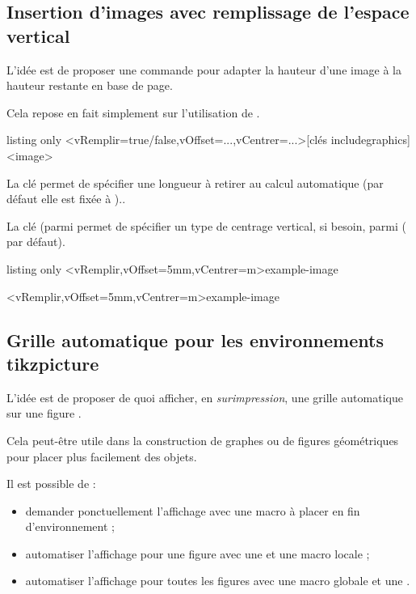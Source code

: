 \documentclass[french,11pt,a4paper]{article}
\begin{document}
\subsection{Insertion d'images avec remplissage de l'espace vertical}

L'idée est de proposer une commande pour adapter la hauteur d'une image à la hauteur restante en base de page.

Cela repose en fait simplement sur l'utilisation de \MontreCode{[height=\textbackslash dimexpr\textbackslash pagegoal-\textbackslash pagetotal\textbackslash relax]}.

\begin{DemoCode}{listing only}
\InsererImage<vRemplir=true/false,vOffset=...,vCentrer=...>[clés includegraphics]<image>
\end{DemoCode}

La clé  permet de spécifier une longueur à retirer au calcul automatique (par défaut elle est fixée à \MontreCode{0pt})..

La clé  (parmi  permet de spécifier un type de centrage vertical, si besoin, parmi  ( par défaut).

\begin{DemoCode}{listing only}
\InsererImage<vRemplir,vOffset=5mm,vCentrer=m>{example-image}
\end{DemoCode}

\InsererImage<vRemplir,vOffset=5mm,vCentrer=m>{example-image}

\subsection{Grille automatique pour les environnements tikzpicture}

L'idée est de proposer de quoi afficher, en \textit{surimpression}, une grille automatique sur une figure .

Cela peut-être utile dans la construction de graphes ou de figures géométriques pour placer plus facilement des objets.

\smallskip

Il est possible de :

\begin{itemize}
	\item demander ponctuellement l'affichage avec une macro à placer en fin d'environnement ;
	\item automatiser l'affichage pour une figure avec une  et une macro locale ;
	\item automatiser l'affichage pour toutes les figures avec une macro globale et une .
\end{itemize}
\end{document}
